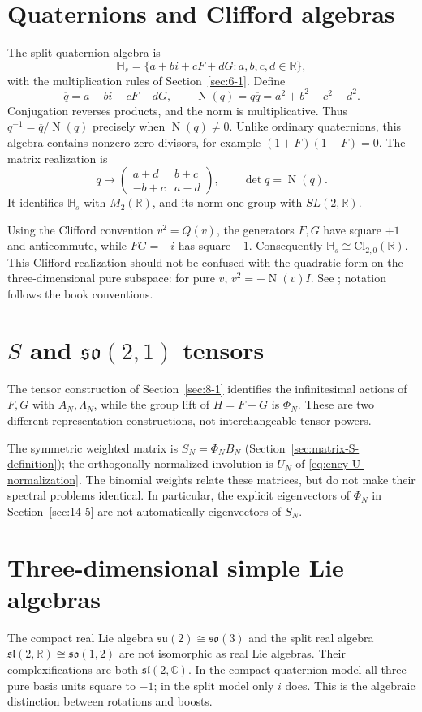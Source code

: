 \section{Quaternions and Clifford algebras}
\label{sec:6-3}
The split quaternion algebra is
\[
\mathbb H_s=\{a+bi+cF+dG:a,b,c,d\in\mathbb R\},
\]
with the multiplication rules of Section~\ref{sec:6-1}. Define
\[
\overline q=a-bi-cF-dG,\qquad
\operatorname{N}(q)=q\overline q=a^2+b^2-c^2-d^2.
\]
Conjugation reverses products, and the norm is multiplicative. Thus
$q^{-1}=\overline q/\operatorname{N}(q)$ precisely when
$\operatorname{N}(q)\ne0$. Unlike ordinary quaternions, this algebra
contains nonzero zero divisors, for example $(1+F)(1-F)=0$.
The matrix realization is
\[
q\longmapsto\begin{pmatrix}a+d&b+c\\-b+c&a-d\end{pmatrix},
\qquad \det q=\operatorname{N}(q).
\]
It identifies $\mathbb H_s$ with $M_2(\mathbb R)$, and its norm-one group
with $SL(2,\mathbb R)$.

Using the Clifford convention $v^2=Q(v)$, the generators $F,G$ have
square $+1$ and anticommute, while $FG=-i$ has square $-1$.
Consequently $\mathbb H_s\cong\mathrm{Cl}_{2,0}(\mathbb R)$.
This Clifford realization should not be confused with the quadratic
form on the three-dimensional pure subspace: for pure $v$,
$v^2=-\operatorname{N}(v)I$.
See \cite[Section~7]{KocikFeynman}; notation follows the book conventions.

\section{$S$ and $\mathfrak{so}(2,1)$ tensors}
\label{sec:6-4}
The tensor construction of Section~\ref{sec:8-1} identifies the
infinitesimal actions of $F,G$ with $A_N,\Lambda_N$, while the group
lift of $H=F+G$ is $\Phi_N$. These are two different representation
constructions, not interchangeable tensor powers.

The symmetric weighted matrix is $S_N=\Phi_NB_N$
(Section~\ref{sec:matrix-S-definition}); the orthogonally normalized
involution is $U_N$ of \eqref{eq:ency-U-normalization}. The binomial
weights relate these matrices, but do not make their spectral problems
identical. In particular, the explicit eigenvectors of $\Phi_N$ in
Section~\ref{sec:14-5} are not automatically eigenvectors of $S_N$.

\section{Three-dimensional simple Lie algebras}
\label{sec:6-5}
The compact real Lie algebra $\mathfrak{su}(2)\cong\mathfrak{so}(3)$
and the split real algebra
$\mathfrak{sl}(2,\mathbb R)\cong\mathfrak{so}(1,2)$ are not isomorphic
as real Lie algebras. Their complexifications are both
$\mathfrak{sl}(2,\mathbb C)$. In the compact quaternion model all three
pure basis units square to $-1$; in the split model only $i$ does.
This is the algebraic distinction between rotations and boosts.

